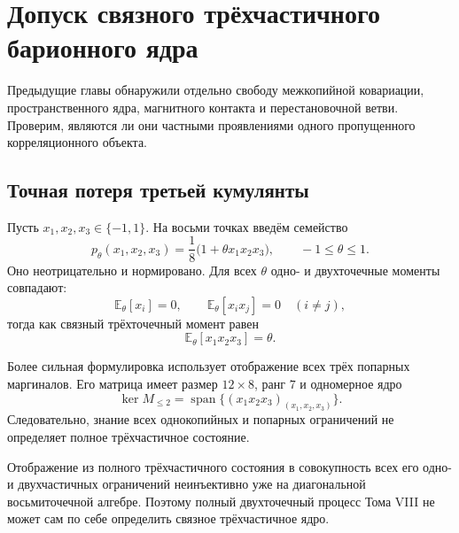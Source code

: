 \chapter{Допуск связного трёхчастичного барионного ядра}
\label{ch:v8-baryon-connected-three-body-kernel-admission-gate}

Предыдущие главы обнаружили отдельно свободу межкопийной ковариации,
пространственного ядра, магнитного контакта и перестановочной ветви. Проверим,
являются ли они частными проявлениями одного пропущенного корреляционного
объекта.

\section{Точная потеря третьей кумулянты}

Пусть $x_1,x_2,x_3\in\{-1,1\}$. На восьми точках введём семейство
\begin{equation}
 p_\theta(x_1,x_2,x_3)
 =\frac18\bigl(1+\theta x_1x_2x_3\bigr),
 \qquad -1\leq\theta\leq1.
 \label{eq:v8-baryon-three-body-parity-family}
\end{equation}
Оно неотрицательно и нормировано. Для всех $\theta$ одно- и двухточечные
моменты совпадают:
\begin{equation}
 \mathbb E_\theta[x_i]=0,
 \qquad
 \mathbb E_\theta[x_ix_j]=0\quad(i\ne j),
 \label{eq:v8-baryon-three-body-lower-moments}
\end{equation}
тогда как связный трёхточечный момент равен
\begin{equation}
 \mathbb E_\theta[x_1x_2x_3]=\theta.
 \label{eq:v8-baryon-three-body-connected-moment}
\end{equation}

Более сильная формулировка использует отображение всех трёх попарных
маргиналов. Его матрица имеет размер $12\times8$, ранг $7$ и одномерное
ядро
\begin{equation}
 \ker M_{\leq2}
 =\operatorname{span}\{(x_1x_2x_3)_{(x_1,x_2,x_3)}\}.
 \label{eq:v8-baryon-pair-marginal-kernel}
\end{equation}
Следовательно, знание всех однокопийных и попарных ограничений не определяет
полное трёхчастичное состояние.

\begin{theorem}
Отображение из полного трёхчастичного состояния в совокупность всех его
одно- и двухчастичных ограничений неинъективно уже на диагональной
восьмиточечной алгебре. Поэтому полный двухточечный процесс Тома VIII не
может сам по себе определить связное трёхчастичное ядро.
\end{theorem}

